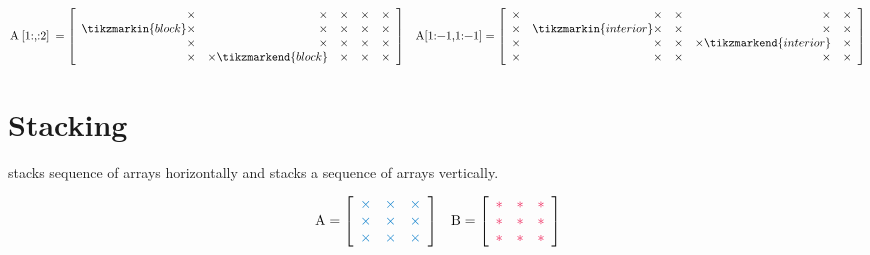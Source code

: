\begin{align*}
\text{\li{A[1:,:2]}} = \left[\begin{array}{rrrrr}
\times & \times & \times & \times & \times\\
\tikzmarkin{block}\times & \times & \times & \times & \times\\
\times & \times & \times & \times & \times\\
\times & \times\tikzmarkend{block} & \times & \times & \times
\end{array}\right]
&&
\text{\li{A[1:-1,1:-1]}} = \left[\begin{array}{rrrrr}
\times & \times & \times & \times & \times\\
\times & \tikzmarkin{interior} \times & \times & \times & \times\\
\times & \times & \times & \times \tikzmarkend{interior} & \times\\
\times & \times & \times & \times & \times\end{array}\right]
\end{align*}

\section*{Stacking} %

 stacks sequence of arrays horizontally and  stacks a sequence of arrays vertically.

\begin{align*}
\text{\li{A}} = \left[\begin{array}{ccc}
\textcolor{blue}{\times}&\textcolor{blue}{\times}&\textcolor{blue}{\times}\\
\textcolor{blue}{\times}&\textcolor{blue}{\times}&\textcolor{blue}{\times}\\
\textcolor{blue}{\times}&\textcolor{blue}{\times}&\textcolor{blue}{\times}
\end{array}\right]
&&
\text{\li{B}} = \left[\begin{array}{ccc}
\textcolor{red}{*} & \textcolor{red}{*} & \textcolor{red}{*} \\
\textcolor{red}{*} & \textcolor{red}{*} & \textcolor{red}{*} \\
\textcolor{red}{*} & \textcolor{red}{*} & \textcolor{red}{*}
\end{array}\right]
\end{align*}


